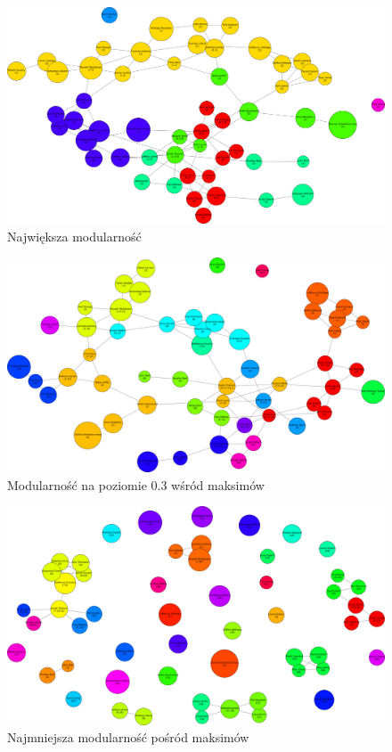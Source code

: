 \documentclass{article}
\begin{document}
\begin{figure}[H]
\centering
\includegraphics[width=\textwidth]{images/is-sample-1.png}
\caption{Największa modularność}
\end{figure}

\begin{figure}[H]
\centering
\includegraphics[width=\textwidth]{images/is-sample-2.png}
\caption{Modularność na poziomie 0.3 wśród maksimów}
\end{figure}

\begin{figure}[H]
\centering
\includegraphics[width=\textwidth]{images/is-sample-3.png}
\caption{Najmniejsza modularność pośród maksimów}
\end{figure}
\end{document}
